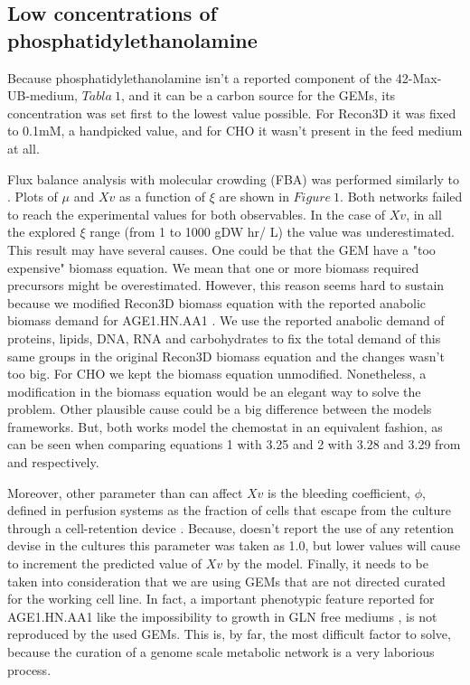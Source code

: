 \subsection{Low concentrations of phosphatidylethanolamine} 
	
	Because phosphatidylethanolamine isn't a reported component of the 42-Max-UB-medium, $Tabla\ 1$, and it can be a carbon source for the GEMs, its concentration was set first to the lowest value possible. For Recon3D it was fixed to 0.1mM, a handpicked value, and for CHO it wasn't present in the feed medium at all.
	
	Flux balance analysis with molecular crowding (FBA) was performed similarly to \cite{Fernandez-de-Cossio-Diaz2018b}. Plots of $\mu$ and $Xv$ as a function of $\xi$ are shown in $Figure\ 1$. Both networks failed to reach the experimental values for both observables. In the case of $Xv$, in all the explored $\xi$ range (from 1 to 1000 gDW hr/ L) the value was underestimated. This result may have several causes. One could be that the GEM have a "too expensive" biomass equation. We mean that one or more biomass required precursors might be overestimated. However, this reason seems hard to sustain because we modified Recon3D biomass equation with the reported anabolic biomass demand for AGE1.HN.AA1 \cite{Niklas2013}. We use the reported anabolic demand of proteins, lipids, DNA, RNA and carbohydrates to fix the total demand of this same groups in the original Recon3D biomass equation and the changes wasn't too big. For CHO we kept the biomass equation unmodified. Nonetheless, a modification in the biomass equation would be an elegant way to solve the problem. Other plausible cause could be a big difference between the models frameworks. But, both works model the chemostat in an equivalent fashion, as can be seen when comparing equations 1 with 3.25 and 2 with 3.28 and 3.29 from \cite{Fernandez-de-Cossio-Diaz2017} and \cite{Rath2017a} respectively.
	 
	Moreover, other parameter than can affect $Xv$ is the bleeding coefficient, $\phi$,
	defined in perfusion systems as the fraction of cells that escape from the culture through a cell-retention device \cite{Fernandez-de-Cossio-Diaz2017}. Because, \cite{Rath2017a} doesn't report the use of any retention devise in the cultures this parameter was taken as 1.0, but lower values will cause to increment the predicted value of  $Xv$ by the model. Finally, it needs to be taken into consideration that we are using GEMs that are not directed curated for the working cell line. In fact, a important phenotypic feature reported for AGE1.HN.AA1 like the impossibility to growth in GLN free mediums \cite{Rath2017a}, is not reproduced by the used GEMs. This is, by far, the most difficult factor to solve, because the curation of a genome scale metabolic network is a very laborious process.

